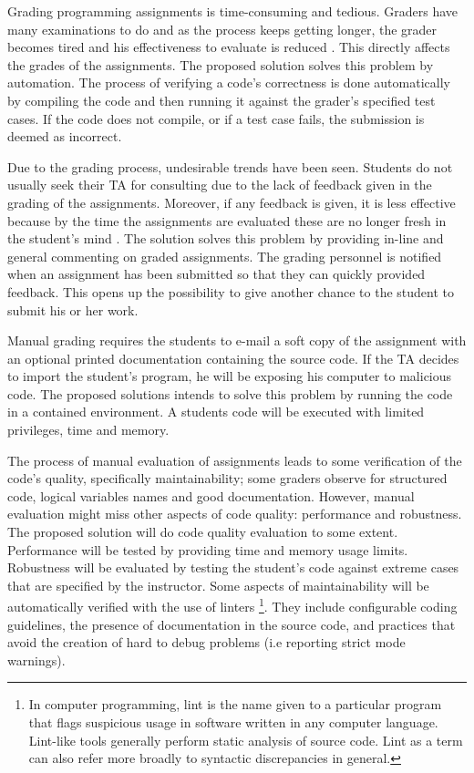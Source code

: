 
Grading programming assignments is time-consuming and tedious. Graders have many
examinations to do and as the process keeps getting longer, the grader becomes
tired and his effectiveness to evaluate is reduced \cite{Cheang2003}. This
directly affects the grades of the assignments. The proposed solution solves
this problem by automation. The process of verifying a code's correctness is
done automatically by compiling the code and then running it against the
grader's specified test cases. If the code does not compile, or if a test case
fails, the submission is deemed as incorrect.


Due to the grading process, undesirable trends have been seen. Students do not
usually seek their TA for consulting due to the lack of feedback given in the
grading of the assignments. Moreover, if any feedback is given, it is less
effective because by the time the assignments are evaluated these are no longer
fresh in the student's mind \cite{Cheang2003}. The solution solves this problem
by providing in-line and general commenting on graded assignments. The grading
personnel is notified when an assignment has been submitted so that they can
quickly provided feedback. This opens up the possibility to give another chance
to the student to submit his or her work.


Manual grading requires the students to e-mail a soft copy of the assignment
with an optional printed documentation containing the source code. If the TA
decides to import the student's program, he will be exposing his computer to
malicious code. The proposed solutions intends to solve this problem by running
the code in a contained environment. A students code will be executed with
limited privileges, time and memory.


The process of manual evaluation of assignments leads to some verification of
the code's quality, specifically maintainability; some graders observe for
structured code, logical variables names and good documentation. However, manual
evaluation might miss other aspects of code quality: performance and robustness.
The proposed solution will do code quality evaluation to some extent.
Performance will be tested by providing time and memory usage limits. Robustness
will be evaluated by testing the student's code against extreme cases that are
specified by the instructor. Some aspects of maintainability will be
automatically verified with the use of linters \footnote{In computer
programming, lint is the name given to a particular program that flags
suspicious usage in software written in any computer language. Lint-like tools
generally perform static analysis of source code. Lint as a term can also refer
more broadly to syntactic discrepancies in general.}. They include configurable
coding guidelines, the presence of documentation in the source code, and
practices that avoid the creation of hard to debug problems (i.e reporting
strict mode warnings).

